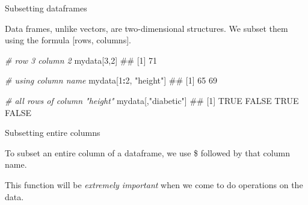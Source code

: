\documentclass[ignorenonframetext,]{beamer}
\newenvironment{Shaded}{\begin{snugshade}}{\end{snugshade}}
\newcommand{\DecValTok}[1]{\textcolor[rgb]{0.00,0.00,0.81}{#1}}
\newcommand{\StringTok}[1]{\textcolor[rgb]{0.31,0.60,0.02}{#1}}
\newcommand{\CommentTok}[1]{\textcolor[rgb]{0.56,0.35,0.01}{\textit{#1}}}
\newcommand{\OperatorTok}[1]{\textcolor[rgb]{0.81,0.36,0.00}{\textbf{#1}}}
\newcommand{\NormalTok}[1]{#1}
\begin{document}
\begin{frame}[fragile]{Subsetting dataframes}

Data frames, unlike vectors, are two-dimensional structures. We subset
them using the formula {[}rows, columns{]}.

\begin{Shaded}
\begin{Highlighting}[]
\CommentTok{# row 3 column 2}
\NormalTok{mydata[}\DecValTok{3}\NormalTok{,}\DecValTok{2}\NormalTok{]}
\NormalTok{## [1] 71}
\end{Highlighting}
\end{Shaded}

\begin{Shaded}
\begin{Highlighting}[]
\CommentTok{# using column name}
\NormalTok{mydata[}\DecValTok{1}\OperatorTok{:}\DecValTok{2}\NormalTok{, }\StringTok{"height"}\NormalTok{]}
\NormalTok{## [1] 65 69}
\end{Highlighting}
\end{Shaded}

\begin{Shaded}
\begin{Highlighting}[]
\CommentTok{# all rows of column "height"}
\NormalTok{mydata[,}\StringTok{"diabetic"}\NormalTok{]}
\NormalTok{## [1]  TRUE FALSE  TRUE FALSE}
\end{Highlighting}
\end{Shaded}

\end{frame}

\begin{frame}[fragile]{Subsetting entire columns}

To subset an entire column of a dataframe, we use \$ followed by that
column name.

\begin{Shaded}
\end{Shaded}

This function will be \emph{extremely important} when we come to do
operations on the data.

\end{frame}
\end{document}
